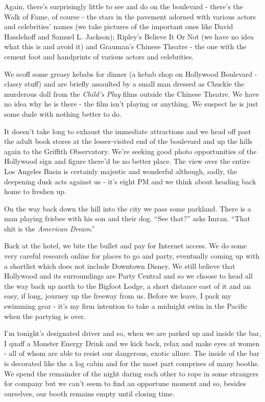 \documentclass[a5paper,titlepage,11pt,draft]{book}
\begin{document}
Again, there's surprisingly little to see and do on the boulevard - there's the Walk of Fame, of course - the stars in the pavement adorned with various actors and celebrities' names (we take pictures of the important ones like David Hasslehoff and Samuel L. Jackson); Ripley's Believe It Or Not (we have no idea what this is and avoid it) and Grauman's Chinese Theatre - the one with the cement foot and handprints of various actors and celebrities.

We scoff some greasy kebabs for dinner (a kebab shop on Hollywood Boulevard - classy stuff) and are briefly assaulted by a small man dressed as Chuckie the murderous doll from the \emph{Child's Play} films outside the Chinese Theatre.  We have no idea why he is there - the film isn't playing or anything.  We suspect he is just some dude with nothing better to do.

It doesn't take long to exhaust the immediate attractions and we head off past the adult book stores at the lesser-visited end of the boulevard and up the hills again to the Griffith Observatory.  We're seeking good photo opportunities of the Hollywood sign and figure there'd be no better place.  The view over the entire Los Angeles Basin is certainly majestic and wonderful although, sadly, the deepening dusk acts against us - it's eight PM and we think about heading back home to freshen up.

On the way back down the hill into the city we pass some parkland.  There is a man playing frisbee with his son and their dog. ``See that?'' asks Imran.  ``That shit is the \emph{American Dream}.''

Back at the hotel, we bite the bullet and pay for Internet access.  We do some very careful research online for places to go and party, eventually coming up with a shortlist which does not include Downtown Disney.  We still believe that Hollywood and its surroundings are Party Central and so we choose to head all the way back up north to the Bigfoot Lodge, a short distance east of it and an easy, if long, journey up the freeway from us.  Before we leave, I pack my swimming gear - it's my firm intention to take a midnight swim in the Pacific when the partying is over.

I'm tonight's designated driver and so, when we are parked up and inside the bar, I quaff a Monster Energy Drink and we kick back, relax and make eyes at women - all of whom are able to resist our dangerous, exotic allure.  The inside of the bar is decorated like the a log cabin and for the most part comprises of many booths.  We spend the remainder of the night daring each other to rope in some strangers for company but we can't seem to find an opportune moment and so, besides ourselves, our booth remains empty until closing time.
\end{document}
